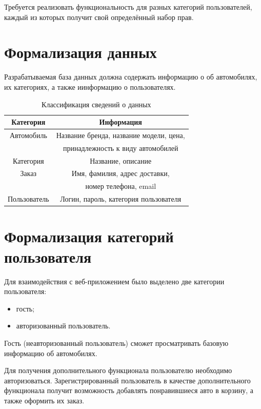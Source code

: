 \documentclass[a4paper,14pt, unknownkeysallowed]{extreport}
\begin{document}
Требуется реализовать функциональность для разных категорий пользователей, каждый из которых получит свой определённый набор прав.

\section{Формализация данных}

Разрабатываемая база данных должна содержать информацию о об автомобилях, их категориях, а также иинформацию о пользователях.

\begin{center}
\captionsetup{justification=raggedright,singlelinecheck=off}
\begin{longtable}[c]{|c|c|}
\caption{Классификация сведений о данных}
	\\ \hline
	\textbf{Категория} & \textbf{Информация}
	\\ \hline
	Автомобиль   & Название бренда, название модели, цена, 
	\\           & принадлежность к виду автомобилей
	\\ \hline
	Категория    & Название, описание
	\\ \hline
	Заказ        & Имя, фамилия, адрес доставки, 
	\\           & номер телефона, email
	\\ \hline
	Пользователь & Логин, пароль, категория пользователя
	\\ \hline
\end{longtable}
\end{center}

\section{Формализация категорий пользователя}

Для взаимодействия с веб-приложением было выделено две категории пользователя:

\begin{itemize}
	\item гость;
 	\item авторизованный пользователь.
\end{itemize}

Гость (неавторизованный пользователь) сможет просматривать базовую информацию об автомобилях.

Для получения дополнительного функционала пользователю необходимо авторизоваться. Зарегистрированный пользователь в качестве дополнительного функционала получит возможность добавлять понравившиеся авто в корзину, а также оформить их заказ. 
\end{document}
